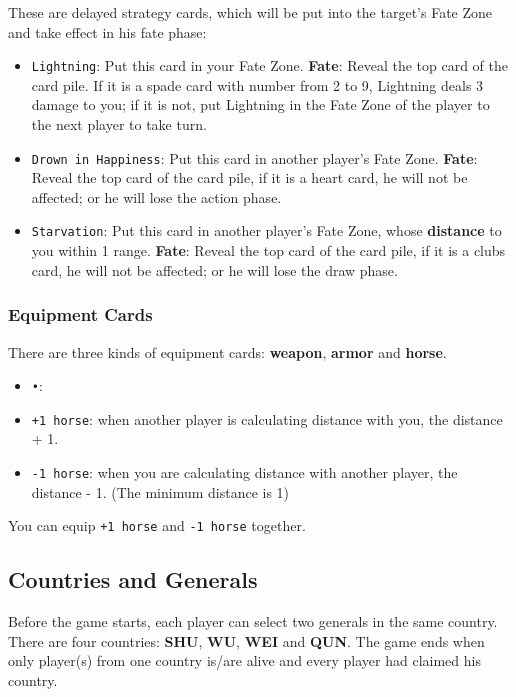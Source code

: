 \documentclass[11pt,a4paper]{article}
\begin{document}
These are delayed strategy cards, which will be put into the target's Fate Zone and take effect in his fate phase:
\begin{itemize}
\item \texttt{Lightning}: Put this card in your Fate Zone. \textbf{Fate}: Reveal the top card of the card pile. If it is a spade card with number from 2 to 9, Lightning deals 3 damage to you; if it is not, put Lightning in the Fate Zone of the player to the next player to take turn.
\item \texttt{Drown in Happiness}: Put this card in another player's Fate Zone. \textbf{Fate}: Reveal the top card of the card pile, if it is a heart card, he will not be affected; or he will lose the action phase.
\item \texttt{Starvation}: Put this card in another player's Fate Zone, whose \textbf{distance} to you within 1 range. \textbf{Fate}: Reveal the top card of the card pile, if it is a clubs card, he will not be affected; or he will lose the draw phase.
\end{itemize}

\subsubsection{Equipment Cards}
There are three kinds of equipment cards: \textbf{weapon}, \textbf{armor} and \textbf{horse}.

\begin{itemize}
\item \texttt{•}: 
\end{itemize}



\begin{itemize}
\item \texttt{+1 horse}: when another player is calculating distance with you, the distance + 1.
\item \texttt{-1 horse}: when you are calculating distance with another player, the distance - 1. (The minimum distance is 1)
\end{itemize}

You can equip \texttt{+1 horse} and \texttt{-1 horse} together.

\subsection{Countries and Generals}

Before the game starts, each player can select two generals in the same country. There are four countries: \textbf{SHU}, \textbf{WU}, \textbf{WEI} and \textbf{QUN}. The game ends when only player(s) from one country is/are alive and every player had claimed his country. \bigskip
\end{document}
